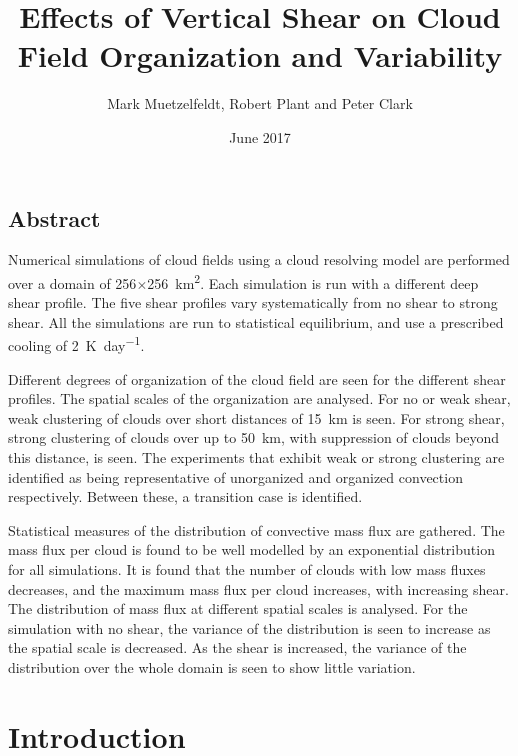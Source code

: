 \documentclass[11pt,a4paper]{article}
\title{Effects of Vertical Shear on Cloud Field Organization and Variability}
\author{Mark Muetzelfeldt, Robert Plant and  Peter Clark}
\date{June 2017}
\begin{document}
\maketitle

\begin{center}
\section*{Abstract}
\end{center}

Numerical simulations of cloud fields using a cloud resolving model are performed over a domain of \SI{256}{}$\times$\SI{256}{km^2}. Each simulation is run with a different deep shear profile. The five shear profiles vary systematically from no shear to strong shear. All the simulations are run to statistical equilibrium, and use a prescribed cooling of \SI{2}{K.day^{-1}}.

Different degrees of organization of the cloud field are seen for the different shear profiles. The spatial scales of the organization are analysed. For no or weak shear, weak clustering of clouds over short distances of \SI{15}{km} is seen. For strong shear, strong clustering of clouds over up to \SI{50}{km}, with suppression of clouds beyond this distance, is seen. The experiments that exhibit weak or strong clustering are identified as being representative of unorganized and organized convection respectively. Between these, a transition case is identified.

Statistical measures of the distribution of convective mass flux are gathered. The mass flux per cloud is found to be well modelled by an exponential distribution for all simulations. It is found that the number of clouds with low mass fluxes decreases, and the maximum mass flux per cloud increases, with increasing shear. The distribution of mass flux at different spatial scales is analysed. For the simulation with no shear, the variance of the distribution is seen to increase as the spatial scale is decreased. As the shear is increased, the variance of the distribution over the whole domain is seen to show little variation.\\

\section{Introduction}
\end{document}
